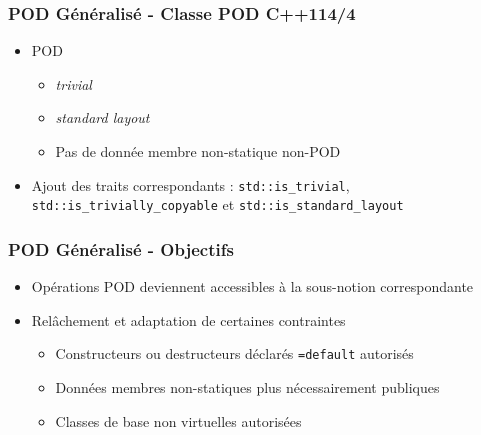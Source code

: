 \documentclass[C++.tex]{subfiles}
\begin{document}
\begin{frame}[fragile]
	\frametitle{POD Généralisé - Classe POD C++11\titlehfill{}4/4}
	\begin{itemize}
		\item POD
		\begin{itemize}
			\item \textit{trivial}
			\item \textit{standard layout}
			\item Pas de donnée membre non-statique non-POD
		\end{itemize}
		\item Ajout des traits correspondants : \lstinline|std::is_trivial|, \lstinline|std::is_trivially_copyable| et \lstinline|std::is_standard_layout|
	\end{itemize}
\end{frame}

\begin{frame}[fragile]
	\frametitle{POD Généralisé - Objectifs}
	\begin{itemize}
		\item Opérations POD deviennent accessibles à la sous-notion correspondante
		\item Relâchement et adaptation de certaines contraintes
		\begin{itemize}
			\item Constructeurs ou destructeurs déclarés \lstinline|=default| autorisés
			\item Données membres non-statiques plus nécessairement publiques


			\item Classes de base non virtuelles autorisées

		\end{itemize}
	\end{itemize}
\end{frame}
\end{document}
